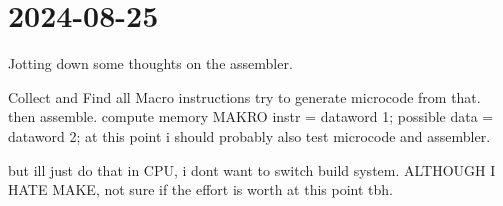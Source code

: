 \section{2024-08-25}

Jotting down some thoughts on the assembler.

Collect and Find all Macro instructions
try to generate microcode from that.
then assemble.
compute memory MAKRO instr = dataword 1; possible data = dataword 2;
at this point i should probably also test microcode and assembler.

but ill just do that in CPU, i dont want to switch build system. ALTHOUGH I HATE MAKE, not sure if the effort is worth at this point tbh.
